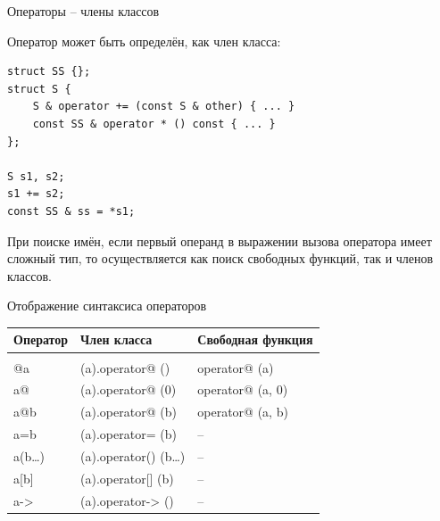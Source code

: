 \documentclass[unknownkeysallowed,xcolor=table]{beamer}
\begin{document}
\begin{frame}[fragile]{Операторы -- члены классов}

Оператор может быть определён, как член класса:

\vspace{0.5em}

\begin{lstlisting}
struct SS {};
struct S {
    S & operator += (const S & other) { ... }
    const SS & operator * () const { ... }
};

S s1, s2;
s1 += s2;
const SS & ss = *s1;
\end{lstlisting}

\vspace{1em}

При поиске имён, если первый операнд в выражении вызова оператора имеет сложный тип, то осуществляется как поиск свободных функций, так и членов классов.
\end{frame}

\begin{frame}[fragile]{Отображение синтаксиса операторов}

\begin{center}
\begin{tabular}{l l l}
  \hline
    Оператор & Член класса & Свободная функция \\
  \hline
    & &\\
    @a & (a).operator@ () & operator@ (a) \\
    a@ & (a).operator@ (0) & operator@ (a, 0) \\
    a@b & (a).operator@ (b) & operator@ (a, b) \\
    a=b & (a).operator= (b) & -- \\
    a(b…) & (a).operator() (b…) & -- \\
    a[b] & (a).operator[] (b) & -- \\
    a-> & (a).operator-> () & -- \\
\end{tabular}
\end{center}

\end{frame}
\end{document}

